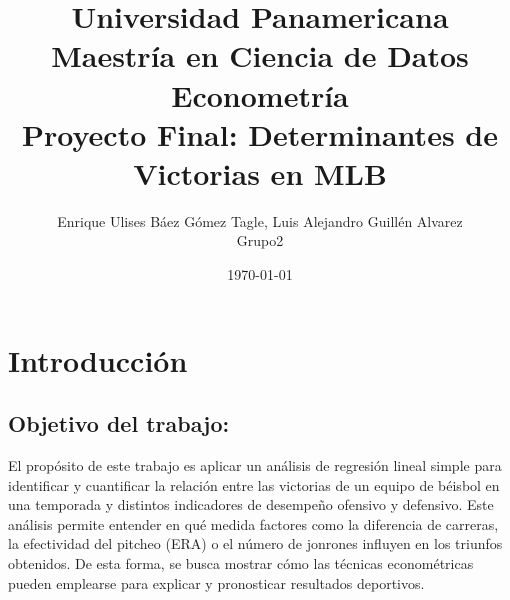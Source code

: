 \documentclass[10pt]{article}
\title{Universidad Panamericana\\ 
Maestría en Ciencia de Datos\\ 
Econometría\\ \vspace{0.5cm} 
Proyecto Final: Determinantes de Victorias en MLB
}
\author{Enrique Ulises Báez Gómez Tagle,
    Luis Alejandro Guillén Alvarez\\
    Grupo2
}
\date{\today}
\begin{document}
\maketitle

\tableofcontents

\newpage
\section{Introducción}
\subsection{Objetivo del trabajo:}
El propósito de este trabajo es aplicar un análisis de regresión lineal simple para identificar y cuantificar la relación entre las victorias de un equipo de béisbol en una temporada y distintos indicadores de desempeño ofensivo y defensivo. Este análisis permite entender en qué medida factores como la diferencia de carreras, la efectividad del pitcheo (ERA) o el número de jonrones influyen en los triunfos obtenidos. De esta forma, se busca mostrar cómo las técnicas econométricas pueden emplearse para explicar y pronosticar resultados deportivos.
\end{document}
